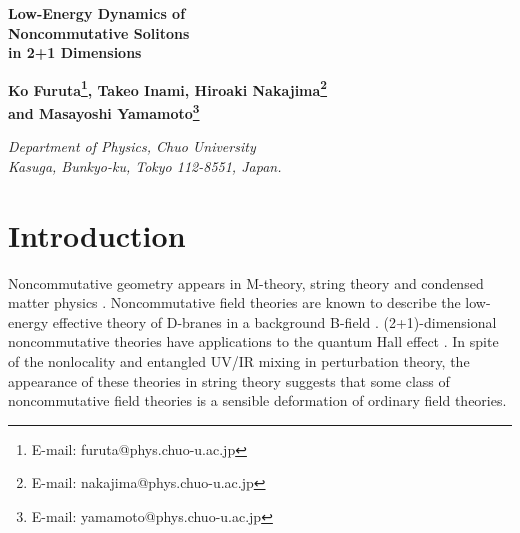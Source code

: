 \documentclass[a4paper,12pt]{article}
\begin{document}
\setcounter{page}{0}

\begin{titlepage}

\bigskip

\begin{center}
{\LARGE\bf
Low-Energy Dynamics of\\ Noncommutative \coordHE{} Solitons\\ \vspace{3mm}
in 2+1 Dimensions}

\vspace{10mm}

\bigskip
{\renewcommand{\thefootnote}{\fnsymbol{footnote}}
\large\bf 
Ko Furuta\footnote{
E-mail: furuta@phys.chuo-u.ac.jp}, 
Takeo Inami, 
Hiroaki Nakajima\footnote{
E-mail: nakajima@phys.chuo-u.ac.jp}\\
and Masayoshi Yamamoto\footnote{
E-mail: yamamoto@phys.chuo-u.ac.jp}
}

\setcounter{footnote}{0}
\bigskip

{\small \it
Department of Physics, Chuo University\\
Kasuga, Bunkyo-ku, Tokyo 112-8551, Japan.\\
}

\end{center}
\bigskip


\begin{abstract}
We investigate the low-energy dynamics of the BPS solitons of the noncommutative \coordHE{} model 
in 2+1 dimensions using the moduli space metric of the BPS solitons. 
We show that the dynamics of a single soliton coincides with that in the commutative model. 
We find that the singularity in the two-soliton moduli space, which exists in the 
commutative \coordHE{} model, disappears in the noncommutative model.
We also show that the two-soliton metric has the smooth commutative limit.
\end{abstract}

\end{titlepage}


\section{Introduction}

Noncommutative geometry appears in M-theory, string theory and condensed matter physics 
\cite{Nek}.
Noncommutative field theories are known to describe the low-energy effective theory of D-branes
in a background B-field \cite{CDS,CK,SW}.
(2+1)-dimensional noncommutative theories have applications to the quantum Hall effect 
\cite{Suss etc}. 
In spite of the nonlocality and entangled UV/IR mixing 
in perturbation theory, the appearance of these theories 
in string theory suggests that some class of noncommutative 
field theories is a sensible deformation of ordinary 
field theories.
\end{document}
